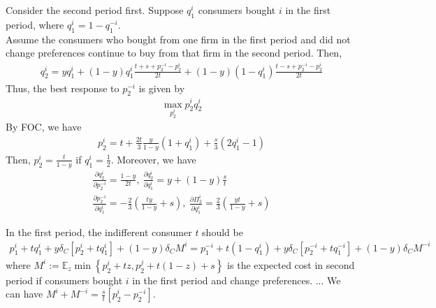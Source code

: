 \documentclass[11pt]{elegantbook}
\begin{document}
Consider the second period first. Suppose $q_1^i$ consumers bought $i$ in the first period, where $q_1^i=1-q_1^{-i}$.\\
Assume the consumers who bought from one firm in the first period and did not change preferences continue to buy from that firm in the second period. Then,
\begin{equation}
    \begin{aligned}
        q_2^i=yq_1^i+(1-y)q_1^i\frac{t+s+p_2^{-i}-p_2^i}{2t}+(1-y)(1-q_1^i)\frac{t-s+p_2^{-i}-p_2^i}{2t}
    \end{aligned}
    \nonumber
\end{equation}
Thus, the best response to $p_2^{-i}$ is given by
\begin{equation}
    \begin{aligned}
        \max_{p_2^i}p_2^iq_2^i
    \end{aligned}
    \nonumber
\end{equation}
By FOC, we have
\begin{equation}
    \begin{aligned}
        p_2^i=t+\frac{2t}{3}\frac{y}{1-y}\left(1+q_1^i\right)+\frac{s}{3}\left(2q_1^i-1\right)
    \end{aligned}
    \nonumber
\end{equation}
Then, $p_2^i=\frac{t}{1-y}$ if $q_1^i=\frac{1}{2}$.
Moreover, we have
\begin{equation}
    \begin{aligned}
        \frac{\partial q_2^i}{\partial p_2^{-i}}=\frac{1-y}{2t},\
        \frac{\partial q_2^i}{\partial q_1^i}=y+(1-y)\frac{s}{t}\\
        \frac{\partial p_2^{-i}}{\partial q_1^i}=-\frac{2}{3}\left(\frac{ty}{1-y}+s\right),\ \frac{\partial \Pi_2^i}{\partial q_1^i}=\frac{2}{3}\left(\frac{yt}{1-y}+s\right)
    \end{aligned}
    \nonumber
\end{equation}

In the first period, the indifferent consumer $t$ should be
\begin{equation}
    \begin{aligned}
        p_1^i+tq_1^i+y\delta_C\left[p_2^i+t q_1^i\right]+(1-y)\delta_C M^i=p_1^{-i}+t(1-q_1^i)+y\delta_C\left[p_2^{-i}+tq_1^{-i}\right]+(1-y)\delta_C M^{-i}
    \end{aligned}
    \nonumber
\end{equation}
where $M^i:=\mathbb{E}_z\min\left\{p_2^i+tz,p_2^j+t(1-z)+s\right\}$ is the expected cost in second period if consumers bought $i$ in the first period and change preferences. ... We can have $M^{i}+M^{-i}=\frac{s}{t}\left[p_2^i-p_2^{-i}\right]$.
\end{document}
